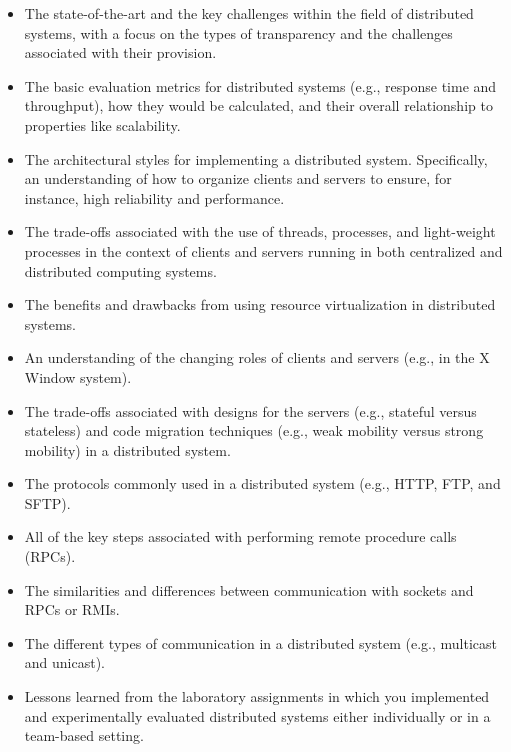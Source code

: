 \vspace*{-.05in}
\begin{itemize}

  \itemsep 0in

  \item The state-of-the-art and the key challenges within the field of distributed systems, with a focus on the types
    of transparency and the challenges associated with their provision.

  \item The basic evaluation metrics for distributed systems (e.g., response time and throughput), how they would be
    calculated, and their overall relationship to properties like scalability.

  \item The architectural styles for implementing a distributed system. Specifically, an understanding of how to
    organize clients and servers to ensure, for instance, high reliability and performance.

  \item The trade-offs associated with the use of threads, processes, and light-weight processes in the context of
    clients and servers running in both centralized and distributed computing systems.

  \item The benefits and drawbacks from using resource virtualization in distributed systems.

  \item An understanding of the changing roles of clients and servers (e.g., in the X Window system).

  \item The trade-offs associated with designs for the servers (e.g., stateful versus stateless) and code migration
    techniques (e.g., weak mobility versus strong mobility) in a distributed system.

  \item The protocols commonly used in a distributed system (e.g., HTTP, FTP, and SFTP).

  \item All of the key steps associated with performing remote procedure calls (RPCs).

  \item The similarities and differences between communication with sockets and RPCs or RMIs.

  \item The different types of communication in a distributed system (e.g., multicast and unicast).

  \item Lessons learned from the laboratory assignments in which you implemented and experimentally evaluated
    distributed systems either individually or in a team-based setting.

\end{itemize}

